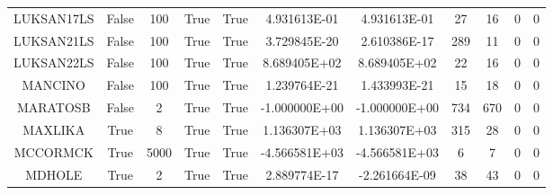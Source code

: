 \begin{longtable}{ccccccccccc}
	\cellcolor{default2} LUKSAN17LS& \cellcolor{default2} False& \cellcolor{default2} 100& \cellcolor{default2} True& \cellcolor{default2} True& \cellcolor{best} 4.931613E-01& \cellcolor{ok} 4.931613E-01& \cellcolor{ok} 27& \cellcolor{best} 16& \cellcolor{default2} 0& \cellcolor{default2} 0\\
	\cellcolor{default1} LUKSAN21LS& \cellcolor{default1} False& \cellcolor{default1} 100& \cellcolor{default1} True& \cellcolor{default1} True& \cellcolor{best} 3.729845E-20& \cellcolor{ok} 2.610386E-17& \cellcolor{poor} 289& \cellcolor{best} 11& \cellcolor{default1} 0& \cellcolor{default1} 0\\
	\cellcolor{default2} LUKSAN22LS& \cellcolor{default2} False& \cellcolor{default2} 100& \cellcolor{default2} True& \cellcolor{default2} True& \cellcolor{best} 8.689405E+02& \cellcolor{ok} 8.689405E+02& \cellcolor{ok} 22& \cellcolor{best} 16& \cellcolor{default2} 0& \cellcolor{default2} 0\\
	\cellcolor{default1} MANCINO& \cellcolor{default1} False& \cellcolor{default1} 100& \cellcolor{default1} True& \cellcolor{default1} True& \cellcolor{best} 1.239764E-21& \cellcolor{ok} 1.433993E-21& \cellcolor{best} 15& \cellcolor{ok} 18& \cellcolor{default1} 0& \cellcolor{default1} 0\\
	\cellcolor{default2} MARATOSB& \cellcolor{default2} False& \cellcolor{default2} 2& \cellcolor{default2} True& \cellcolor{default2} True& \cellcolor{best} -1.000000E+00& \cellcolor{ok} -1.000000E+00& \cellcolor{ok} 734& \cellcolor{best} 670& \cellcolor{default2} 0& \cellcolor{default2} 0\\
	\cellcolor{default1} MAXLIKA& \cellcolor{default1} True& \cellcolor{default1} 8& \cellcolor{default1} True& \cellcolor{default1} True& \cellcolor{ok} 1.136307E+03& \cellcolor{best} 1.136307E+03& \cellcolor{poor} 315& \cellcolor{best} 28& \cellcolor{default1} 0& \cellcolor{default1} 0\\
	\cellcolor{default2} MCCORMCK& \cellcolor{default2} True& \cellcolor{default2} 5000& \cellcolor{default2} True& \cellcolor{default2} True& \cellcolor{ok} -4.566581E+03& \cellcolor{best} -4.566581E+03& \cellcolor{best} 6& \cellcolor{ok} 7& \cellcolor{default2} 0& \cellcolor{default2} 0\\
	\cellcolor{default1} MDHOLE& \cellcolor{default1} True& \cellcolor{default1} 2& \cellcolor{default1} True& \cellcolor{default1} True& \cellcolor{ok} 2.889774E-17& \cellcolor{best} -2.261664E-09& \cellcolor{best} 38& \cellcolor{ok} 43& \cellcolor{default1} 0& \cellcolor{default1} 0\\

\end{longtable}
